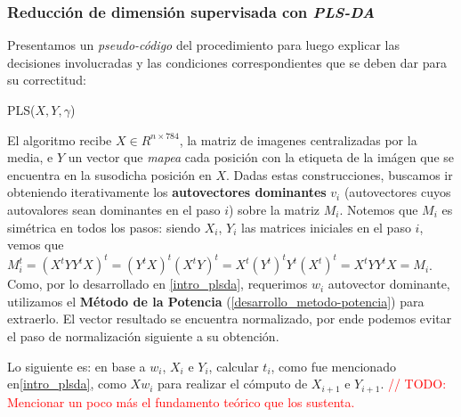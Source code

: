 \newpage
\subsubsection{Reducci\'on de dimensi\'on supervisada con \textit{PLS-DA}}

Presentamos un \textit{pseudo-c\'odigo} del procedimiento para luego explicar las decisiones involucradas y las condiciones correspondientes que se deben dar para su correctitud: \\

\begin{algorithm}
\begin{algorithmic}[1]
 
\ENDFOR
{}
\end{algorithmic}
\caption{PLS($X, Y, \gamma$)}
\end{algorithm}

El algoritmo recibe $X \in R^{n \times 784}$, la matriz de imagenes centralizadas por la media, e $Y$ un vector que \textit{mapea} cada posici\'on con la etiqueta de la im\'agen que se encuentra en la susodicha posici\'on en $X$. Dadas estas construcciones, buscamos ir obteniendo iterativamente los \textbf{autovectores dominantes} $v_{i}$ (autovectores cuyos autovalores sean dominantes en el paso $i$) sobre la matriz $M_{i}$. Notemos que $M_{i}$ es sim\'etrica en todos los pasos: siendo $X_{i}$, $Y_{i}$ las matrices iniciales en el paso $i$, vemos que $M_{i}^{t} = (X^{t}YY^{t}X)^{t} = (Y^{t}X)^{t}(X^{t}Y)^{t} = X^{t}(Y^{t})^{t}Y^{t}(X^{t})^{t} = X^{t}YY^{t}X = M_{i}$. Como, por lo desarrollado en \ref{intro_plsda}, requerimos $w_{i}$ autovector dominante, utilizamos el \textbf{M\'etodo de la Potencia} (\ref{desarrollo_metodo-potencia}) para extraerlo. El vector resultado se encuentra normalizado, por ende podemos evitar el paso de normalizaci\'on siguiente a su obtenci\'on.

Lo siguiente es: en base a $w_{i}$, $X_{i}$ e $Y_{i}$, calcular $t_{i}$, como fue mencionado en\ref{intro_plsda}, como $Xw_{i}$ para realizar el c\'omputo de $X_{i+1}$ e $Y_{i+1}$. \textcolor{red}{// TODO: Mencionar un poco m\'as el fundamento te\'orico que los sustenta.}

